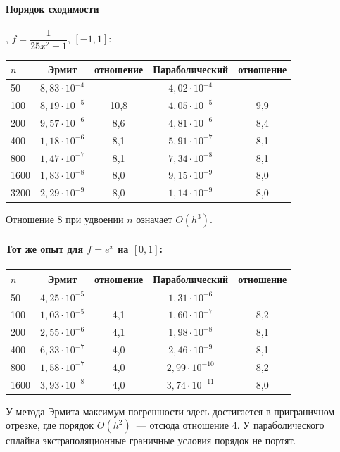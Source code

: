 \documentclass[11pt,a4paper]{report}
\begin{document}
\paragraph{Порядок сходимости}, $f=\dfrac{1}{25x^2+1}$, $[-1,1]$:
\begin{center}
\begin{tabular}{lcccc}
\toprule
$n$ & Эрмит & отношение & Параболический & отношение \\
\midrule
50   & $8{,}83\cdot10^{-4}$ & ---  & $4{,}02\cdot10^{-4}$ & --- \\
100  & $8{,}19\cdot10^{-5}$ & 10,8 & $4{,}05\cdot10^{-5}$ & 9,9 \\
200  & $9{,}57\cdot10^{-6}$ & 8,6  & $4{,}81\cdot10^{-6}$ & 8,4 \\
400  & $1{,}18\cdot10^{-6}$ & 8,1  & $5{,}91\cdot10^{-7}$ & 8,1 \\
800  & $1{,}47\cdot10^{-7}$ & 8,1  & $7{,}34\cdot10^{-8}$ & 8,1 \\
1600 & $1{,}83\cdot10^{-8}$ & 8,0  & $9{,}15\cdot10^{-9}$ & 8,0 \\
3200 & $2{,}29\cdot10^{-9}$ & 8,0  & $1{,}14\cdot10^{-9}$ & 8,0 \\
\bottomrule
\end{tabular}
\end{center}
Отношение $8$ при удвоении $n$ означает $O(h^3)$.

\paragraph{Тот же опыт для $f=e^{x}$ на $[0,1]$:}
\begin{center}
\begin{tabular}{lcccc}
\toprule
$n$ & Эрмит & отношение & Параболический & отношение \\
\midrule
50   & $4{,}25\cdot10^{-5}$ & --- & $1{,}31\cdot10^{-6}$ & --- \\
100  & $1{,}03\cdot10^{-5}$ & 4,1 & $1{,}60\cdot10^{-7}$ & 8,2 \\
200  & $2{,}55\cdot10^{-6}$ & 4,1 & $1{,}98\cdot10^{-8}$ & 8,1 \\
400  & $6{,}33\cdot10^{-7}$ & 4,0 & $2{,}46\cdot10^{-9}$ & 8,1 \\
800  & $1{,}58\cdot10^{-7}$ & 4,0 & $2{,}99\cdot10^{-10}$& 8,2 \\
1600 & $3{,}93\cdot10^{-8}$ & 4,0 & $3{,}74\cdot10^{-11}$& 8,0 \\
\bottomrule
\end{tabular}
\end{center}
У метода Эрмита максимум погрешности здесь достигается в приграничном отрезке,
где порядок $O(h^2)$~--- отсюда отношение $4$. У параболического сплайна
экстраполяционные граничные условия порядок не портят.
\end{document}
